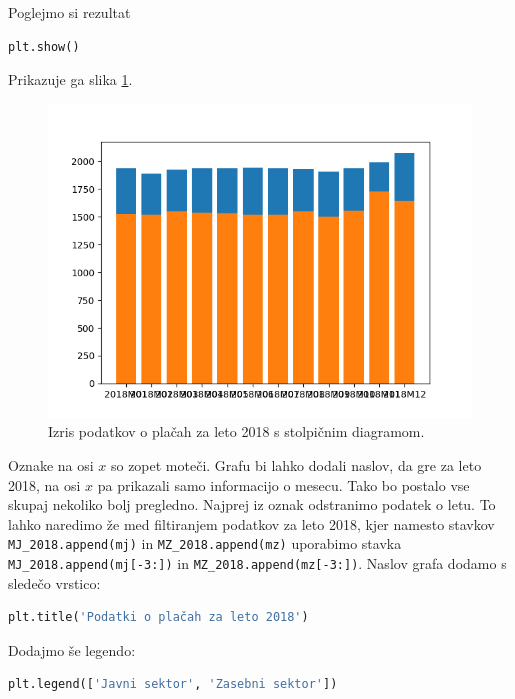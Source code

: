 Poglejmo si rezultat
\begin{lstlisting}[language=Python, showstringspaces=false]
plt.show()
\end{lstlisting}
Prikazuje ga slika \ref{img:plt6}.
\begin{figure}
    \includegraphics[width=\linewidth]{img/plt6.png}
    \caption{Izris podatkov o plačah za leto 2018 s stolpičnim diagramom.}
    \label{img:plt6}
\end{figure}
Oznake na osi $x$ so zopet moteči. Grafu bi lahko dodali naslov, da gre za leto 2018, na osi $x$ pa prikazali samo informacijo o mesecu. Tako bo postalo vse skupaj nekoliko bolj pregledno. Najprej iz oznak odstranimo podatek o letu. To lahko naredimo že med filtiranjem podatkov za leto 2018, kjer namesto stavkov \texttt{MJ\_2018.append(mj)} in \texttt{MZ\_2018.append(mz)} uporabimo stavka \texttt{MJ\_2018.append(mj[-3:])} in \texttt{MZ\_2018.append(mz[-3:])}. Naslov grafa dodamo s sledečo vrstico:
\begin{lstlisting}[language=Python, showstringspaces=false]
plt.title('Podatki o plačah za leto 2018')
\end{lstlisting}
Dodajmo še legendo:
\begin{lstlisting}[language=Python, showstringspaces=false]
plt.legend(['Javni sektor', 'Zasebni sektor'])
\end{lstlisting}

